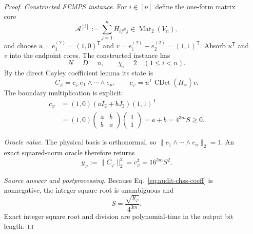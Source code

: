 \documentclass[aps,pra,reprint,superscriptaddress,nofootinbib,longbibliography,showkeys]{revtex4-2}
\theoremstyle{definition}
\newcommand{\Mat}{\operatorname{Mat}}
\newcommand{\CDet}{\operatorname{CDet}}
\begin{document}
\begin{proof}
\noindent\textit{Constructed FEMPS instance.}\quad
For $i\in[n]$ define the one-form matrix core
\begin{equation}
\mathcal A^{[i]}:=\sum_{j=1}^{n}H_{ij}e_j\in\Mat_2(V_n),
\end{equation}
and choose $u=e_1^{(2)}=(1,0)^{\mathsf T}$ and
$v=e_1^{(2)}+e_2^{(2)}=(1,1)^{\mathsf T}$.  Absorb $u^{\mathsf T}$ and $v$
into the endpoint cores.  The constructed instance has
\begin{equation}
N=D=n,\qquad \chi_i=2\quad(1\le i<n).
\end{equation}
By the direct Cayley coefficient lemma its state is
\begin{equation}
C_\varphi=c_\varphi\,e_1\wedge\cdots\wedge e_n,
\qquad
c_\varphi=u^{\mathsf T}\CDet(H_\varphi)v.
\end{equation}
The boundary multiplication is explicit:
\begin{align}
c_\varphi
&=(1,0)(aI_2+bJ_2)(1,1)^{\mathsf T}\nonumber\\
&=(1,0)\begin{pmatrix}a&b\\b&a\end{pmatrix}
  \begin{pmatrix}1\\1\end{pmatrix}
=a+b=4^{3m}S\ge0.
\label{eq:audit-chss-coeff}
\end{align}

\medskip\noindent\textit{Oracle value.}\quad
The physical basis is orthonormal, so
$\|e_1\wedge\cdots\wedge e_n\|_2=1$.  An exact squared-norm oracle therefore
returns
\begin{equation}
y_\varphi:=\|C_\varphi\|_2^2
=c_\varphi^2=16^{3m}S^2.
\label{eq:audit-chss-norm}
\end{equation}

\medskip\noindent\textit{Source answer and postprocessing.}\quad
Because Eq.~\eqref{eq:audit-chss-coeff} is nonnegative, the integer square
root is unambiguous and
\begin{equation}
S=\frac{\sqrt{y_\varphi}}{4^{3m}}.
\label{eq:audit-chss-recover}
\end{equation}
Exact integer square root and division are polynomial-time in the output bit
length.


\end{proof}
\end{document}
